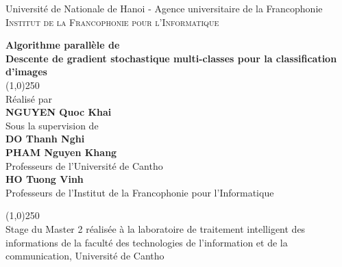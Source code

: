 \begin{titlepage}
\begin{center}
Université de Nationale de Hanoi - Agence universitaire de la Francophonie\\
\normalsize
\textsc{Institut de la Francophonie pour l'Informatique}\\[1.0in]
\end{center}


\begin{flushright}
\Large {\textbf{Algorithme parallèle de \\
Descente de gradient stochastique multi-classes pour la classification d'images}}\\[0.5in]

\line(1,0){250} \\

\normalsize Réalisé par \\
\textbf{NGUYEN Quoc Khai}\\[0.5cm]

Sous la supervision de \\
{\textbf{DO Thanh Nghi}}\\
{\textbf{PHAM Nguyen Khang}}\\
Professeurs de l'Université de Cantho \\[0.5cm]

{\textbf{HO Tuong Vinh}}\\
Professeurs de l'Institut de la Francophonie pour l'Informatique


\vfill

\vspace{0.2cm}

\line(1,0){250} \\
Stage du Master 2 réalisée à la laboratoire de traitement intelligent des informations de la faculté des technologies de l'information et de la communication, Université de Cantho

\end{flushright}
\end{titlepage}
